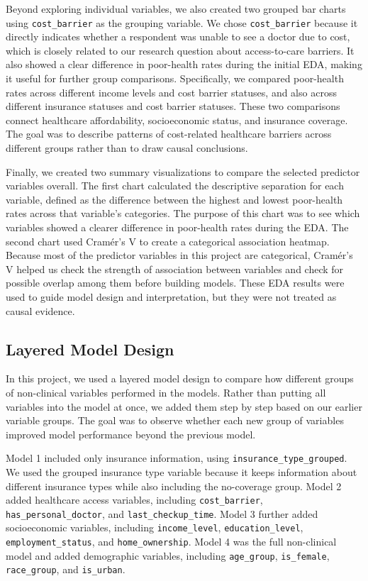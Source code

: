 Beyond exploring individual variables, we also created two grouped bar charts using \texttt{cost\_barrier} as the grouping variable. We chose \texttt{cost\_barrier} because it directly indicates whether a respondent was unable to see a doctor due to cost, which is closely related to our research question about access-to-care barriers. It also showed a clear difference in poor-health rates during the initial EDA, making it useful for further group comparisons. Specifically, we compared poor-health rates across different income levels and cost barrier statuses, and also across different insurance statuses and cost barrier statuses. These two comparisons connect healthcare affordability, socioeconomic status, and insurance coverage. The goal was to describe patterns of cost-related healthcare barriers across different groups rather than to draw causal conclusions.

Finally, we created two summary visualizations to compare the selected predictor variables overall. The first chart calculated the descriptive separation for each variable, defined as the difference between the highest and lowest poor-health rates across that variable's categories. The purpose of this chart was to see which variables showed a clearer difference in poor-health rates during the EDA. The second chart used Cramér's V to create a categorical association heatmap. Because most of the predictor variables in this project are categorical, Cramér's V helped us check the strength of association between variables and check for possible overlap among them before building models. These EDA results were used to guide model design and interpretation, but they were not treated as causal evidence.

\subsection{Layered Model Design}
In this project, we used a layered model design to compare how different groups of non-clinical variables performed in the models. Rather than putting all variables into the model at once, we added them step by step based on our earlier variable groups. The goal was to observe whether each new group of variables improved model performance beyond the previous model.

Model 1 included only insurance information, using \texttt{insurance\_type\_grouped}. We used the grouped insurance type variable because it keeps information about different insurance types while also including the no-coverage group. Model 2 added healthcare access variables, including \texttt{cost\_barrier}, \texttt{has\_personal\_doctor}, and \texttt{last\_checkup\_time}. Model 3 further added socioeconomic variables, including \texttt{income\_level}, \texttt{education\_level}, \texttt{employment\_status}, and \texttt{home\_ownership}. Model 4 was the full non-clinical model and added demographic variables, including \texttt{age\_group}, \texttt{is\_female}, \texttt{race\_group}, and \texttt{is\_urban}.

